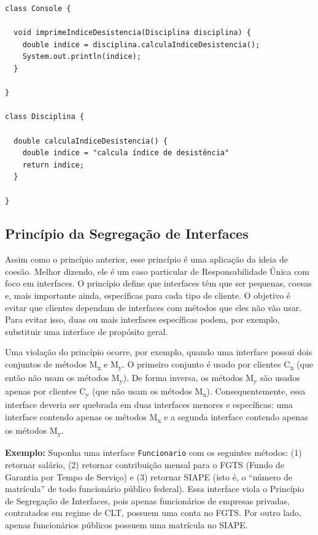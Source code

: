 \documentclass[
  11pt,
  twoside]{book}
\newcommand{\passthrough}[1]{#1}
\begin{document}
\begin{lstlisting}
class Console {

  void imprimeIndiceDesistencia(Disciplina disciplina) {
    double indice = disciplina.calculaIndiceDesistencia();
    System.out.println(indice);
  }

}

class Disciplina {

  double calculaIndiceDesistencia() {
    double indice = "calcula índice de desistência"
    return indice;
  }

}
\end{lstlisting}

\hypertarget{princuxedpio-da-segregauxe7uxe3o-de-interfaces}{%
\subsection{Princípio da Segregação de
Interfaces}\label{princuxedpio-da-segregauxe7uxe3o-de-interfaces}}


Assim como o princípio anterior, esse princípio é uma aplicação da ideia
de coesão. Melhor dizendo, ele é um caso particular de Responsabilidade
Única com foco em interfaces. O princípio define que interfaces têm que
ser pequenas, coesas e, mais importante ainda, específicas para cada
tipo de cliente. O objetivo é evitar que clientes dependam de interfaces
com métodos que eles não vão usar. Para evitar isso, duas ou mais
interfaces específicas podem, por exemplo, substituir uma interface de
propósito geral.

Uma violação do princípio ocorre, por exemplo, quando uma interface
possui dois conjuntos de métodos M\textsubscript{x} e
M\textsubscript{y}. O primeiro conjunto é usado por clientes
C\textsubscript{x} (que então não usam os métodos M\textsubscript{y}).
De forma inversa, os métodos M\textsubscript{y} são usados apenas por
clientes C\textsubscript{y} (que não usam os métodos
M\textsubscript{x}). Consequentemente, essa interface deveria ser
quebrada em duas interfaces menores e específicas: uma interface
contendo apenas os métodos M\textsubscript{x} e a segunda interface
contendo apenas os métodos M\textsubscript{y}.

\textbf{Exemplo:} Suponha uma interface
\passthrough{\lstinline!Funcionario!} com os seguintes métodos: (1)
retornar salário, (2) retornar contribuição mensal para o FGTS (Fundo de
Garantia por Tempo de Serviço) e (3) retornar SIAPE (isto é, o ``número
de matrícula'' de todo funcionário público federal). Essa interface
viola o Princípio de Segregação de Interfaces, pois apenas funcionários
de empresas privadas, contratados em regime de CLT, possuem uma conta no
FGTS. Por outro lado, apenas funcionários públicos possuem uma matrícula
no SIAPE.
\end{document}
